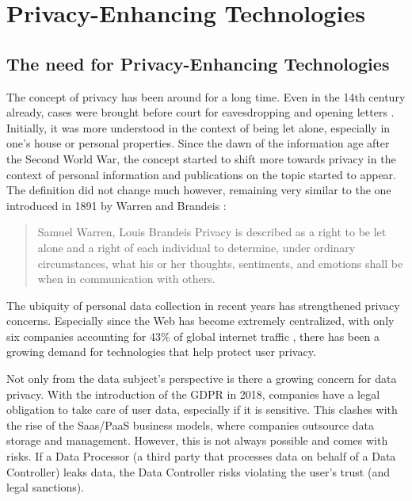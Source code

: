\newpage
\section{Privacy-Enhancing Technologies}
\label{sec:pets}
\subsection{The need for Privacy-Enhancing Technologies}
The concept of privacy has been around for a long time. Even in the 14th century already, cases were brought before court for eavesdropping and opening letters \citep{privacy-history}. Initially, it was more understood in the context of being let alone, especially in one's house or personal properties. Since the dawn of the information age after the Second World War, the concept started to shift more towards privacy in the context of personal information and publications on the topic started to appear. The definition did not change much however, remaining very similar to the one introduced in 1891 by Warren and Brandeis \citep{privacy-history}:
\begin{quote}{Samuel Warren, Louis Brandeis}
    Privacy is described as a right to be let alone and a right of each individual  to  determine,  under  ordinary  circumstances,  what  his  or  her  thoughts, sentiments, and emotions shall be when in communication with others.
\end{quote}
\noindent The ubiquity of personal data collection in recent years has strengthened privacy concerns. Especially since the Web has become extremely centralized, with only six companies accounting for 43\% of global internet traffic \citep{internet-report}, there has been a growing demand for technologies that help protect user privacy.

Not only from the data subject's perspective is there a growing concern for data privacy. With the introduction of the \gls{GDPR} in 2018, companies have a legal obligation to take care of user data, especially if it is sensitive. This clashes with the rise of the Saas/PaaS business models, where companies outsource data storage and management. However, this is not always possible and comes with risks. If a Data Processor (a third party that processes data on behalf of a Data Controller) leaks data, the Data Controller risks violating the user's trust (and legal sanctions). 

